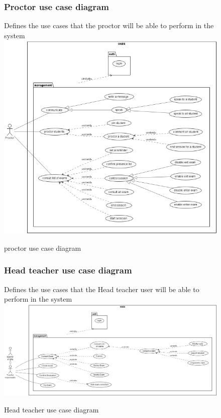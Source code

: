 \documentclass[]{uc2pfecaneva}
\begin{document}
    \begin{figure}
        \subsubsection{Proctor use case diagram}
        \raggedright{Defines the use cases that the proctor will be able to perform in the system}
        \linebreak
        \includegraphics[width=\textwidth]{images/proctor_UCD}
        \caption{proctor use case diagram}
    \end{figure}


    \begin{figure}
        \subsubsection{Head teacher use case diagram}
        \raggedright{Defines the use cases that the Head teacher user will be able to perform in the system}
        \linebreak
        \includegraphics[width=450pt]{images/Module_Teacher}
        \caption{Head teacher use case diagram}
    \end{figure}
\end{document}
